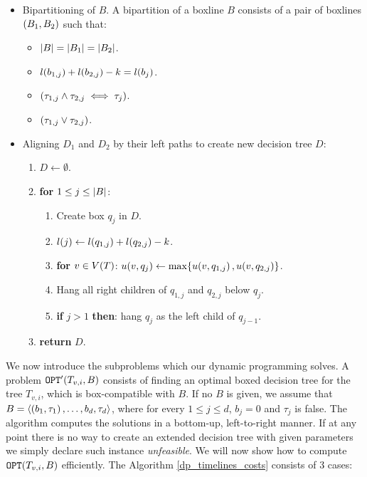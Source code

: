 \begin{itemize}
    \item Bipartitioning of $B$. A bipartition of a boxline $B$ consists of a pair of boxlines $\mathopen{}\left( B_1,B_2 \right)$ such that:
    \begin{itemize}
        \item $\mathopen{}\left| B \right|=\mathopen{}\left| B_1 \right|=\mathopen{}\left| B_2 \right|$.
        \item $l\mathopen{}\left( b_{1,j} \right)+l\mathopen{}\left( b_{2,j} \right) - k = l\mathopen{}\left( b_j \right)$.
        \item $\mathopen{}\left( \tau_{1,j}\land \tau_{2,j} \iff \tau_{j} \right)$.
        \item$\mathopen{}\left( \tau_{1,j}\lor \tau_{2,j} \right)$.
    \end{itemize} 
    \item Aligning $D_1$ and $D_2$ by their left paths to create new decision tree $D$: 
    \begin{enumerate}
        \item $D\gets\emptyset$.
        \item \textbf{for} $1\leq j\leq \mathopen{}\left| B \right|$:
        \begin{enumerate}
            \item Create box $q_j$ in $D$.
            \item $l\mathopen{}\left( j \right)\gets l\mathopen{}\left( q_{1,j} \right)+ l\mathopen{}\left( q_{2,j} \right)-k$.
            \item \textbf{for} $v\in V\mathopen{}\left( T \right)$: $u\mathopen{}\left( v, q_j \right)\gets \max\mathopen{}\left\{ u\mathopen{}\left( v, q_{1,j} \right),u\mathopen{}\left( v, q_{2,j} \right) \right\}$.
            \item Hang all right children of $q_{1,j}$ and $q_{2,j}$ below $q_j$.
            \item \textbf{if} $j>1$ \textbf{then}: hang $q_j$ as the left child of $q_{j-1}$.
        \end{enumerate}
        \item \textbf{return} $D$.
    \end{enumerate}
\end{itemize}

We now introduce the subproblems which our dynamic programming solves. A problem $\texttt{OPT}'\mathopen{}\left( T_{v,i},B \right)$ consists of finding an optimal boxed decision tree for the tree $T_{v,i}$, which is box-compatible with $B$. If no $B$ is given, we assume that $B=\mathopen{}\langle \mathopen{}\left( b_1,\tau_1 \right),\dots, {b_d,\tau_d} \rangle$, where for every $1\leq j\leq d$, $b_j=0$ and $\tau_j$ is false.
 The algorithm computes the solutions in a bottom-up, left-to-right manner. If at any point there is no way to create an extended decision tree with given parameters we simply declare such instance \textit{unfeasible}. We will now show how to compute $\texttt{OPT}\mathopen{}\left( T_{v,i}, B \right)$ efficiently. The Algorithm \ref{dp_timelines_costs} consists of 3 cases:
 
